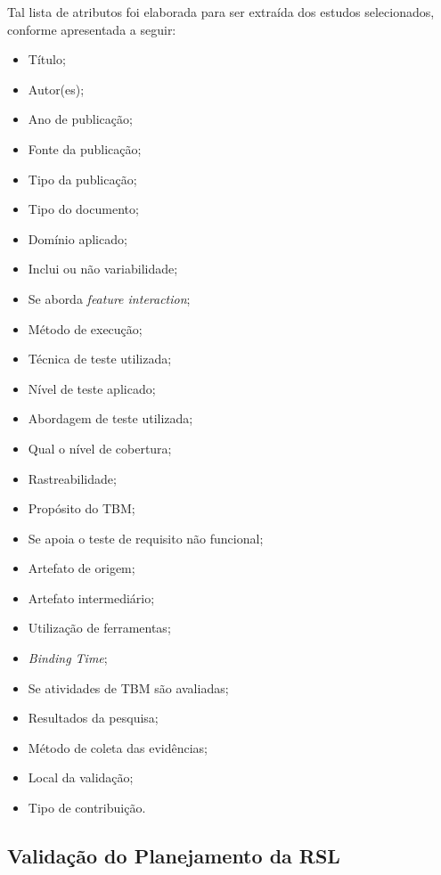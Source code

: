 Tal lista de atributos foi elaborada para ser extraída dos estudos selecionados, conforme apresentada a seguir:

\begin{itemize}
	\item Título;
	\item Autor(es);
	\item Ano de publicação;
	\item Fonte da publicação;
	\item Tipo da publicação;
	\item Tipo do documento;
	\item Domínio aplicado;
	\item Inclui ou não variabilidade;
	\item Se aborda \textit{feature interaction};
	\item Método de execução;
	\item Técnica de teste utilizada;
	\item Nível de teste aplicado;
	\item Abordagem de teste utilizada;
	\item Qual o nível de cobertura;
	\item Rastreabilidade;
	\item Propósito do TBM;
	\item Se apoia o teste de requisito não funcional;
	\item Artefato de origem;
	\item Artefato intermediário;
	\item Utilização de ferramentas;
	\item \textit{Binding Time};
	\item Se atividades de TBM são avaliadas;
	\item Resultados da pesquisa;
	\item Método de coleta das evidências;
	\item Local da validação;
	\item Tipo de contribuição.
	
\end{itemize}


\subsection{Validação do Planejamento da RSL}

